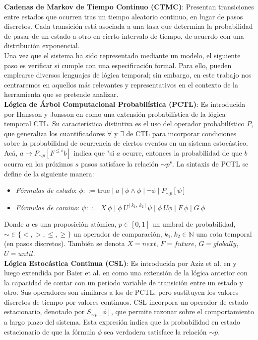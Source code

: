 \documentclass[runningheads]{llncs}
\begin{document}
\textbf{Cadenas de Markov de Tiempo Continuo (CTMC)}: Presentan transiciones entre estados que ocurren tras un tiempo aleatorio continuo, en lugar de pasos discretos. Cada transición está asociada a una tasa que determina la probabilidad de pasar de un estado a otro en cierto intervalo de tiempo, de acuerdo con una distribución exponencial.\\

Una vez que el sistema ha sido representado mediante un modelo, el siguiente paso es verificar si cumple con una especificación formal. Para ello, pueden emplearse diversos lenguajes de lógica temporal; sin embargo, en este trabajo nos centraremos en aquellos más relevantes y representativos en el contexto de la herramienta que se pretende analizar.\\

\textbf{Lógica de Árbol Computacional Probabilística (PCTL)}: Es introducida por Hansson y Jonsson en \cite{HH94} como una extensión probabilística de la lógica temporal CTL. Su característica distintiva es el uso del operador probabilístico $P$, que generaliza los cuantificadores $\forall$ y $\exists$ de CTL para incorporar condiciones sobre la probabilidad de ocurrencia de ciertos eventos en un sistema estocástico. Acá, $a\to P_{\sim p}[F^{\le s} b]$ indica que "si $a$ ocurre, entonces la probabilidad de que $b$ ocurra en los próximos $s$ pasos satisface la relación $\sim p$". La sintaxis de PCTL se define de la siguiente manera:

\begin{itemize}
    \item \textit{Fórmulas de estado}: \( \phi ::= \text{true} \mid a \mid \phi \land \phi \mid \neg \phi \mid P_{\sim p}[\psi]\)
    \item \textit{Fórmulas de camino}: \(\psi ::= X\ \phi \mid \phi \ U^{[k_1,\ k_2]} \psi \mid \phi \ U \phi \mid F\ \phi \mid G\ \phi\)
\end{itemize}
Donde $a$ es una proposición atómica, $p \in [0,1]$ un umbral de probabilidad, $\sim \in \{<, >, \leq, \geq\}$ un operador de comparación, $k_1,k_2 \in \mathbb{N}$ una cota temporal (en pasos discretos). También se denota $X=next$, $F=future$, $G=globally$, $U=until$.\\

\textbf{Lógica Estocástica Continua (CSL)}: Es introducida por Aziz et al. en \cite{ASSB96} y luego extendida por Baier et al. en \cite{BKH99} como una extensión de la lógica anterior con la capacidad de contar con un período variable de transición entre un estado y otro. Sus operadores son similares a los de PCTL, pero sustituyen los valores discretos de tiempo por valores continuos. CSL incorpora un operador de estado estacionario, denotado por $S_{\sim p}[\phi]$, que permite razonar sobre el comportamiento a largo plazo del sistema. Esta expresión indica que la probabilidad en estado estacionario de que la fórmula $\phi$ sea verdadera satisface la relación $\sim p$.
\end{document}
